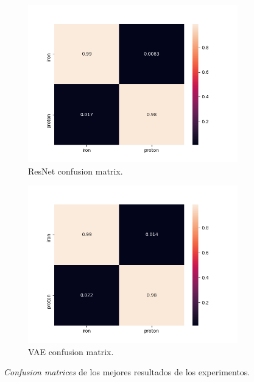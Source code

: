 \begin{figure}[H]
\begin{subfigure}{.5\textwidth}
  \centering
  \includegraphics[width=.8\linewidth]{imagenes/06_Experimentacion/resnetcm.png}  
  \caption{ResNet confusion matrix.}
  \label{fig:resnetcm}
\end{subfigure}
\begin{subfigure}{.5\textwidth}
  \centering
  \includegraphics[width=.8\linewidth]{imagenes/06_Experimentacion/vaecm.png}  
  \caption{VAE confusion matrix.}
  \label{fig:vaecm}
\end{subfigure}
\caption{\textit{Confusion matrices} de los mejores resultados de los experimentos.}
\label{fig:confusion}
\end{figure}

